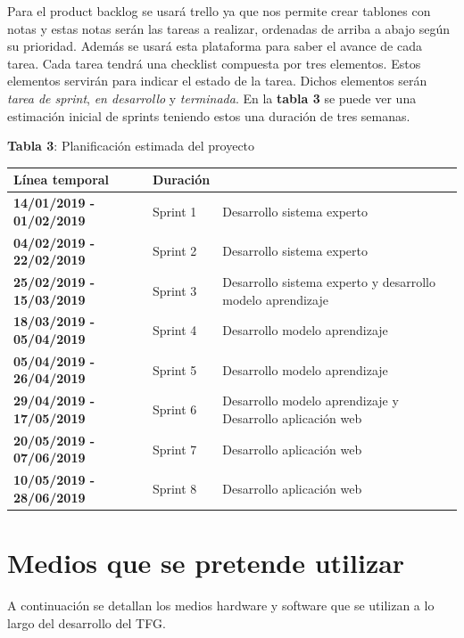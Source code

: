 \documentclass[11pt,a4paper,twoside,final]{article}
\begin{document}
\bigskip

Para el product backlog se usará trello \cite{trello} ya que nos permite crear tablones con notas y estas notas serán las tareas a realizar, ordenadas de arriba a abajo según su prioridad. Además se usará esta plataforma para saber el avance de cada tarea. Cada tarea tendrá una checklist compuesta por tres elementos. Estos elementos servirán para indicar el estado de la tarea. Dichos elementos serán \textit{tarea de sprint}, \textit{en desarrollo} y \textit{terminada}. En la \textbf{tabla 3} se puede ver una estimación inicial de sprints teniendo estos una duración de tres semanas.


\begin{center}
   \textbf{Tabla 3}: Planificación estimada del proyecto\\[1em]
   \begin{tabular}{p{} p{} p{}}
        \hline
		\textbf{Línea temporal} & \textbf{Duración}  & \text{Temática}\\
		\hline
		    \textbf{14/01/2019 - 01/02/2019} & Sprint 1 & Desarrollo sistema experto\\
		    \textbf{04/02/2019 - 22/02/2019} & Sprint 2 & Desarrollo sistema experto \\
		    \textbf{25/02/2019 - 15/03/2019} & Sprint 3 & Desarrollo sistema experto y desarrollo modelo aprendizaje\\
		    \textbf{18/03/2019 - 05/04/2019} & Sprint 4 & Desarrollo modelo aprendizaje\\
		    \textbf{05/04/2019 - 26/04/2019} & Sprint 5 & Desarrollo modelo aprendizaje\\
		    \textbf{29/04/2019 - 17/05/2019} & Sprint 6 & Desarrollo modelo aprendizaje y Desarrollo aplicación web\\
		    \textbf{20/05/2019 - 07/06/2019} & Sprint 7 & Desarrollo aplicación web\\
		    \textbf{10/05/2019 - 28/06/2019} & Sprint 8 & Desarrollo aplicación web\\
		\hline
   \end{tabular}
\end{center}


\newpage
\section{Medios que se pretende utilizar}
A continuación se detallan los medios hardware y software que se utilizan a lo largo del desarrollo del TFG.
\end{document}
